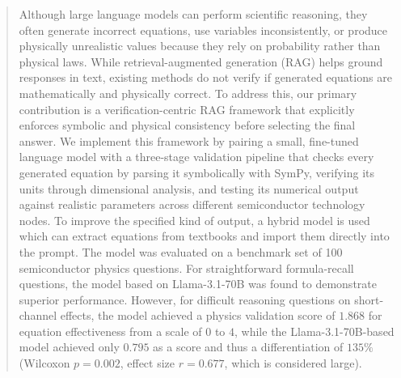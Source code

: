 \documentclass[a4paper,fleqn]{cas-sc}
\begin{document}


\begin{abstract}
Although large language models can perform scientific reasoning, they often generate
incorrect equations, use variables inconsistently, or produce physically unrealistic values
because they rely on probability rather than physical laws. While retrieval-augmented
generation (RAG) helps ground responses in text, existing methods do not verify if generated
equations are mathematically and physically correct. To address this, our primary
contribution is a verification-centric RAG framework that explicitly enforces symbolic
and physical consistency before selecting the final answer. We implement this framework by
pairing a small, fine-tuned language model with a three-stage validation pipeline that
checks every generated equation by parsing it symbolically with SymPy, verifying its units
through dimensional analysis, and testing its numerical output against realistic parameters
across different semiconductor technology nodes. 
To improve the specified kind of output, a hybrid model is used which can extract equations from textbooks and import them directly into the prompt. The model was evaluated on a benchmark set of 100 semiconductor physics questions. For straightforward formula-recall questions, the model based on Llama-3.1-70B was found to demonstrate superior performance. However, for difficult reasoning questions on short-channel effects, the model achieved a physics validation score of $1.868$ for equation effectiveness from a scale of $0$ to $4$, while the Llama-3.1-70B-based model achieved only $0.795$ as a score and thus a differentiation of $135\%$ (Wilcoxon $p = 0.002$, effect size $r = 0.677$, which is considered large).
\end{abstract}
\end{document}
